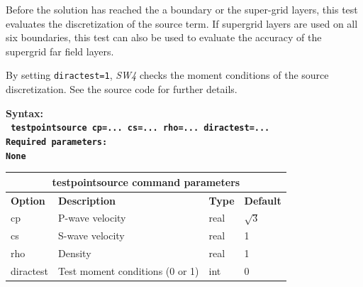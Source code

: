 \documentclass[11pt]{report}
\begin{document}
{Before the solution has reached the a boundary or the super-grid layers, this test evaluates the
discretization of the source term. If supergrid layers are used on all six boundaries, this test can
also be used to evaluate the accuracy of the supergrid far field layers.

By setting \verb+diractest=1+, \emph{SW4} checks the moment conditions of the source
discretization. See the source code for further details.
\begin{flushleft}
	\bf
	Syntax:\\
	\tt
	testpointsource
	cp=... cs=... rho=... diractest=...
	\\
	\bf
	Required parameters:\\
	\rm
	None
\end{flushleft}
\begin{center}
	\begin{tabular}{|l|p{8cm}|l|l|} \hline
		\multicolumn{4}{|c|}{\bf testpointsource command parameters}             \\ \hline
		\bf{Option} & \bf{Description}                & \bf{Type} & \bf{Default} \\ \hline \hline
		cp          & P-wave velocity                 & real      & $\sqrt{3}$   \\ \hline
		cs          & S-wave velocity                 & real      & 1            \\ \hline
		rho         & Density                         & real      & 1            \\ \hline
		diractest   & Test moment conditions (0 or 1) & int       & 0            \\ \hline
	\end{tabular}
\end{center}

}
\end{document}
